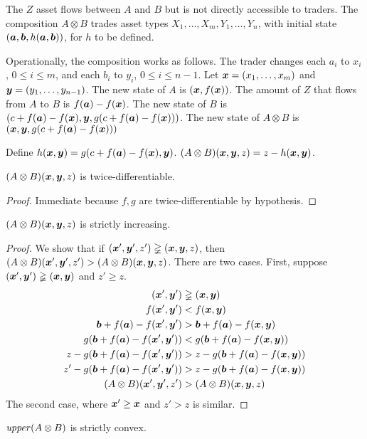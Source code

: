 The $Z$ asset flows between $A$ and $B$ but is
not directly accessible to traders.
The composition $A \otimes B$ trades asset types
$X_1, \ldots, X_m, Y_1, \ldots, Y_n$,
with initial state $(\ba, \bb, h(\ba,\bb))$,
for $h$ to be defined.

Operationally, the composition works as follows.
The trader changes each $a_i$ to $x_i$, $0 \leq i \leq m$,
and each $b_i$ to $y_i$, $0 \leq i \leq n-1$.
Let $\bx=(x_1,\ldots,x_m)$ and $\by=(y_1,\ldots,y_{n-1})$.
The new state of $A$ is $(\bx,f(\bx))$.
The amount of $Z$ that flows from $A$ to $B$ is $f(\ba)-f(\bx)$.
The new state of $B$ is
$(c+f(\ba)-f(\bx), \by, g(c+f(\ba)-f(\bx)))$.
The new state of $A \otimes B$ is
$(\bx,\by,g(c+f(\ba)-f(\bx)))$

Define $h(\bx,\by) = g(c+f(\ba)-f(\bx), \by)$.
$(A \otimes B)(\bx,\by,z) = z - h(\bx,\by)$.
\begin{lemma}
  $(A \otimes B)(\bx,\by,z)$ is twice-differentiable.
\end{lemma}
\begin{proof}
  Immediate because $f,g$ are twice-differentiable by hypothesis.
\end{proof}
\begin{lemma}
  $(A \otimes B)(\bx,\by,z)$ is strictly increasing.
\end{lemma}
\begin{proof}
  We show that if $(\bx',\by',z') \gneqq (\bx,\by,z)$,
  then $(A \otimes B)(\bx',\by',z') > (A \otimes B)(\bx,\by,z)$.
  There are two cases.
  First, suppose $(\bx',\by') \gneqq (\bx,\by)$ and $z' \geq z$.
\begin{align*}
  (\bx',\by') &\gneqq (\bx,\by)\\
  f(\bx',\by') &< f(\bx,\by)\\
  \bb+f(\ba)-f(\bx',\by') &> \bb+f(\ba)-f(\bx,\by)\\
  g(\bb+f(\ba)-f(\bx',\by')) &< g(\bb+f(\ba)-f(\bx,\by))\\
  z-g(\bb+f(\ba)-f(\bx',\by')) &> z-g(\bb+f(\ba)-f(\bx,\by))\\
  z'-g(\bb+f(\ba)-f(\bx',\by')) &> z-g(\bb+f(\ba)-f(\bx,\by))\\
  (A \otimes B)(\bx',\by',z') &> (A \otimes B)(\bx,\by,z)
\end{align*}
  The second case, where $\bx' \geq \bx$ and $z' > z$ is similar.
\end{proof}
\begin{lemma}
  $\upper(A \otimes B)$ is strictly convex.
\end{lemma}

